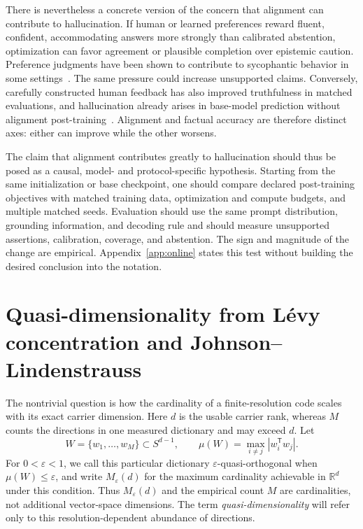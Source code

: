 \documentclass[
  aps,
  reprint,
  superscriptaddress,
  floatfix,
  nofootinbib,
  longbibliography
]{revtex4-2}
\newcommand{\R}{\mathbb{R}}
\newcommand{\Sph}[1]{S^{#1}}
\newcommand{\Msem}{M}
\newcommand{\T}{^{\mathsf{T}}}
\begin{document}
There is nevertheless a concrete version of the concern that alignment can
contribute to hallucination.  If human or learned preferences reward fluent,
confident, accommodating answers more strongly than calibrated abstention,
optimization can favor agreement or plausible completion over epistemic
caution.  Preference judgments have been shown to contribute to sycophantic
behavior in some settings~\cite{sharma2023sycophancy}.  The same pressure could
increase unsupported claims.  Conversely, carefully constructed human
feedback has also improved truthfulness in matched evaluations, and
hallucination already arises in base-model prediction without alignment
post-training~\cite{ouyang2022instructgpt,Kalai2025Why}.  Alignment and factual
accuracy are therefore distinct axes: either can improve while the other
worsens.

The claim that alignment contributes greatly to hallucination should thus be
posed as a causal, model- and protocol-specific hypothesis.  Starting from the
same initialization or base checkpoint, one should compare declared
post-training objectives with matched training data, optimization and compute
budgets, and multiple matched seeds.  Evaluation should use the same prompt
distribution, grounding information, and decoding rule and should measure
unsupported assertions, calibration, coverage, and abstention.  The sign and
magnitude of the change are empirical.  Appendix~\ref{app:online} states this
test without building the desired conclusion into the notation.

\section{Quasi-dimensionality from L\'evy concentration and
Johnson--Lindenstrauss}
\label{sec:concentration}

The nontrivial question is how the cardinality of a finite-resolution code
scales with its exact carrier dimension.  Here $d$ is the usable carrier rank,
whereas $\Msem$ counts the directions in one measured
dictionary and may exceed $d$.  Let
\begin{equation}
\label{eq:quasiortho}
W=\{w_1,\ldots,w_{\Msem}\}\subset\Sph{d-1},
\qquad
\mu(W)=\max_{i\ne j}|w_i\T w_j|.
\end{equation}
For $0<\varepsilon<1$, we call this particular dictionary
$\varepsilon$-quasi-orthogonal when $\mu(W)\leq\varepsilon$, and write
$M_\varepsilon(d)$ for the maximum cardinality achievable in $\R^d$ under
this condition.  Thus
$M_\varepsilon(d)$ and the empirical count $\Msem$ are cardinalities, not
additional vector-space dimensions.  The term \emph{quasi-dimensionality}
will refer only to this resolution-dependent abundance of directions.
\end{document}
